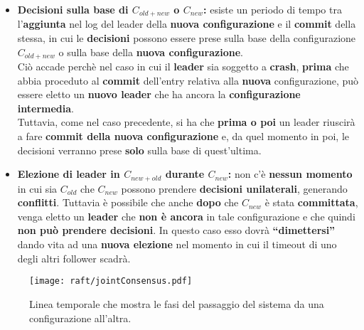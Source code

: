 \begin{itemize}
      \item{\textbf{Decisioni sulla base di $C_{old+new}$ o $C_{new}$:} esiste un periodo di tempo tra l'\textbf{aggiunta} nel log del leader della \textbf{nuova configurazione} e il \textbf{commit} della stessa, in cui le \textbf{decisioni} possono essere prese sulla base della configurazione \textit{$C_{old+new}$} o sulla base della \textbf{nuova configurazione}. \\
      Ciò accade perchè nel caso in cui il \textbf{leader} sia soggetto a \textbf{crash}, \textbf{prima} che abbia proceduto al \textbf{commit} dell'entry relativa alla \textbf{nuova} configurazione, può essere eletto un \textbf{nuovo leader} che ha ancora la \textbf{configurazione intermedia}.\\
      Tuttavia, come nel caso precedente, si ha che \textbf{prima o poi} un leader riuscirà a fare \textbf{commit della nuova configurazione} e, da quel momento in poi, le decisioni verranno prese \textbf{solo} sulla base di quest'ultima.} 

      \item{\textbf{Elezione di leader in $C_{new+old}$ durante $C_{new}$:} non c'è \textbf{nessun momento} in cui sia $C_{old}$ che $C_{new}$ possono prendere \textbf{decisioni unilaterali}, generando \textbf{conflitti}. Tuttavia è possibile che anche \textbf{dopo} che $C_{new}$ è stata \textbf{committata}, venga eletto un \textbf{leader} che \textbf{non è ancora} in tale configurazione e che quindi \textbf{non può prendere decisioni}. In questo caso esso dovrà \textbf{``dimettersi''} dando vita ad una \textbf{nuova elezione} nel momento in cui il timeout di uno degli altri follower scadrà. } 

    \end{itemize}

  \begin{figure}[H]
    \centering
    \texttt{[image: raft/jointConsensus.pdf]}
    \caption{Linea temporale che mostra le fasi del passaggio del sistema da una configurazione all'altra.}
    \label{fig:figure 9}
  \end{figure}

